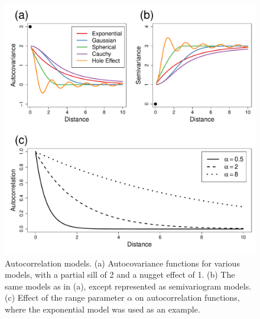 \documentclass[11pt, titlepage]{article}\usepackage[]{graphicx}\usepackage[]{color}
\begin{document}
\begin{spacing}{1.9}
\begin{flushleft}
\begin{singlespace}
	\begin{figure}[H]
	  \begin{center}
	    \includegraphics[width=\linewidth]{figure/autocorrModels-1.pdf}
	  \end{center}
	  \caption{Autocorrelation models. (a) Autocovariance functions for various models, with a partial sill of 2 and a nugget effect of 1. (b) The same models as in (a), except represented as semivariogram models. (c) Effect of the range parameter $\alpha$ on autocorrelation functions, where the exponential model was used as an example.  \label{fig:autocorrModels}}
  \end{figure}





\end{singlespace}
\end{flushleft}
\end{spacing}
\end{document}

